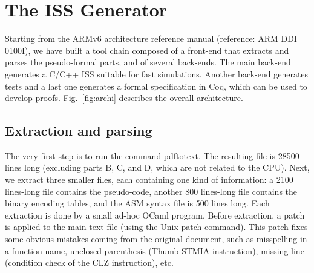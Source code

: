 \documentclass[conference]{ieeeconf}
\begin{document}

\section{The ISS Generator}
\label{s:gen}

Starting from the ARMv6 architecture reference manual (reference: {\stt ARM DDI
  0100I}), we have built a tool chain composed of a front-end that extracts and
parses the pseudo-formal parts, and of several back-ends. The main back-end
generates a C/C++ ISS suitable for fast simulations. Another back-end generates
tests and a last one generates a formal specification in Coq, which can be used
to develop proofs.  Fig.~\ref{fig:archi} describes the overall architecture.

\begin{figure*}\centering
{}
\caption{Overall Architecture}
\label{fig:archi}
\end{figure*}

\subsection{Extraction and parsing}

The very first step is to run the command {\stt pdftotext}. The
resulting file is 28500 lines long (excluding parts B, C, and D,
which are not related to the CPU). Next, we extract three smaller files,
each containing one kind of information: a 2100 lines-long file
contains the pseudo-code, another 800 lines-long file contains the
binary encoding tables, and the ASM syntax file is 500 lines
long. Each extraction is done by a small ad-hoc OCaml program. Before
extraction, a patch is applied to the main text file (using the Unix
{\stt patch} command). This patch fixes some obvious mistakes coming
from the original document, such as misspelling in a function name,
unclosed parenthesis (Thumb STMIA instruction), missing line
(condition check of the {\stt CLZ} instruction), etc.
\end{document}
